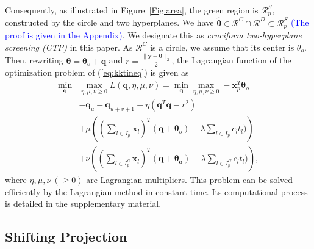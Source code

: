 \documentclass[twoside]{article}
\theoremstyle{plain}
\renewcommand{\vec}[1]{\bm{#1}}
\newcommand{\changeXS}[1]{\textcolor{blue}{#1}}
\begin{document}
Consequently, as illustrated in Figure~\ref{Fig:area}, the green region is $\mathcal{R}^{S}_{p}$, constructed by the circle and two hyperplanes. We have $\hat{\vec{\theta}}  \in \mathcal{R}^{C}\cap\mathcal{R}^{D} \subset \mathcal{R}^{S}_{p}$ \changeXS{(The proof is given in the Appendix)}.
We designate this as {\it cruciform two-hyperplane screening (CTP)} in this paper. As $\mathcal{R}^{C}$ is a circle, we assume that its center is $\theta_o$. Then, rewriting $\vec \theta = \vec \theta_o + \vec q$ and $r = \frac{\|\vec y - \vec \theta\|_2}{2}$, the Lagrangian function of the optimization problem of (\ref{eq:kktineq}) is given as 
%
\begin{equation}
\label{Eq:FinalRSCalc}
\begin{split}
\min_{\vec{q}}& \max_{\eta,\mu,\nu \geq 0} L(\vec{q},\eta,\mu,\nu) =\min_{\vec{q}}\max_{\eta,\mu,\nu\geq0} - \vec x_p^{T}\vec \theta_o \\
&- \vec{q}_{u} - \vec{q}_{u+v+1} + \eta( \vec{q}^T\vec{q} - r^2)\\
&+\mu\left( (\sum_{l\in I_p}\vec{x}_{l})^T(\vec{q}+\vec\theta_o) -  \lambda\sum_{l\in I_p}c_lt_l)\right) \\
&+ \nu\left( (\sum_{l\in I^{C}_p}\vec{x}_{l})^T(\vec{q}+\vec{\theta_o}) -\lambda\sum_{l\in I^{C}_p}c_lt_l)\right),
\end{split}
\end{equation}
where $\eta,\mu,\nu~(\geq 0)$ are Lagrangian multipliers. This problem can be solved efficiently by the Lagrangian method in constant time. Its computational process is detailed in the supplementary material.




\subsection{Shifting Projection}
\end{document}
